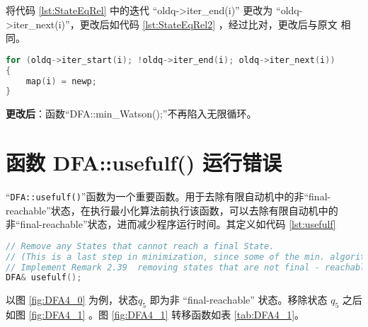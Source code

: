 将代码 \ref{lst:StateEqRel} 中的迭代 “oldq->iter\_end(i)” 更改为 “oldq->iter\_next(i)”，更改后如代码 \ref{lst:StateEqRel2} ，经过比对，更改后与原文 \cite{watson1994design} 相同。
\lstset{style=mystyle}
\begin{lstlisting}[language=C++,label={lst:StateEqRel2},caption={StateEqRel.cpp}]
for (oldq->iter_start(i); !oldq->iter_end(i); oldq->iter_next(i))
{
    map(i) = newp;
}
\end{lstlisting}

{\bfseries 更改后}：函数“DFA::min\_Watson();”不再陷入无限循环。


\section{函数 DFA::usefulf() 运行错误}\label{sec:usefulf}

“\verb+DFA::usefulf()+”函数为一个重要函数。用于去除有限自动机中的非“final-reachable”状态，在执行最小化算法前执行该函数，可以去除有限自动机中的非“final-reachable”状态，进而减少程序运行时间。其定义如代码 \ref{lst:usefulf}
\lstset{style=mystyle}
\begin{lstlisting}[language=C++,label={lst:usefulf},caption={DFA::usefulf()}]
// Remove any States that cannot reach a final State.
// (This is a last step in minimization, since some of the min. algorithms may yield a DFA with a sink state.)
// Implement Remark 2.39  removing states that are not final - reachable.
DFA& usefulf();
\end{lstlisting}
以图 \ref{fig:DFA4_0} 为例，状态$q_5$ 即为非 “final-reachable” 状态。移除状态 $q_5$ 之后如图 \ref{fig:DFA4_1} 。图 \ref{fig:DFA4_1} 转移函数如表 \ref{tab:DFA4_1}。

